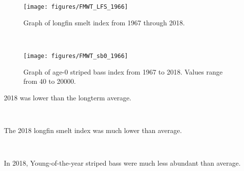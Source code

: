 \documentclass[
]{book}
\begin{document}
\begin{panel-grid}
\begin{columns-nocenter}
\begin{column800}
\begin{expand}

\begin{figure}
\texttt{[image: figures/FMWT\_LFS\_1966]} \caption{Graph of longfin smelt index from 1967 through 2018.}\label{fig:unnamed-chunk-125}
\end{figure}

\end{expand}

\end{column800}

\begin{column40}

~

\end{column40}

\begin{column800}

\begin{expand}

\begin{figure}
\texttt{[image: figures/FMWT\_sb0\_1966]} \caption{Graph of age-0 striped bass index from 1967 to 2018. Values range from 40 to 20000.}\label{fig:unnamed-chunk-126}
\end{figure}

\end{expand}

\end{column800}

\end{columns-nocenter}

\begin{columns-nocenter}

\begin{column800}

2018 was lower than the longterm average.

\end{column800}

\begin{column40}

~

\end{column40}

\begin{column800}

The 2018 longfin smelt index was much lower than average.

\end{column800}

\begin{column40}

~

\end{column40}

\begin{column800}

In 2018, Young-of-the-year striped bass were much less abundant than average.

\end{column800}

\end{columns-nocenter}

\end{panel-grid}
\end{document}
